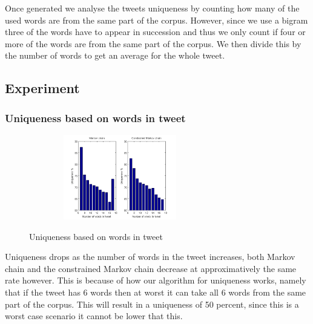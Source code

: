 \documentclass[a4paper,12pt]{article}
\begin{document}
Once generated we analyse the tweets uniqueness by counting how many of the used words are from the same part of the corpus. However, since we use a bigram three of the words have to appear in succession and thus we only count if four or more of the words are from the same part of the corpus. We then divide this by the number of words to get an average for the whole tweet.

\newpage
\subsection{Experiment}

\subsubsection{Uniqueness based on words in tweet}

\begin{figure}[h!]
  \hfill
  \begin{center}
  	{\includegraphics[width=300, height = 140]{UniqByNumWordsTweet.png}}
  \end{center}
  \caption{Uniqueness based on words in tweet}
 \end{figure}
 
 Uniqueness drops as the number of words in the tweet increases, both Markov chain and the constrained Markov chain decrease at  approximatively the same rate however. This is because of how our algorithm for uniqueness works, namely that if the tweet has 6 words then at worst it can take all 6 words from the same part of the corpus. This will result in a uniqueness of 50 percent, since this is a worst case scenario it cannot be lower that this.
 
\end{document}

